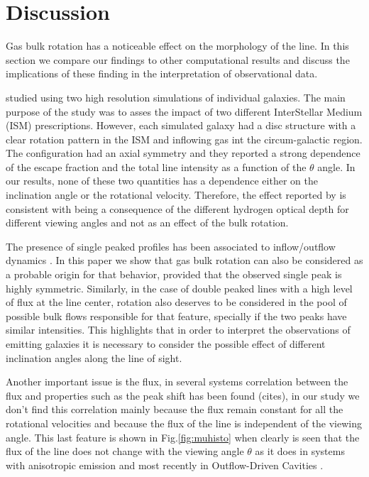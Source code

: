 \documentclass{emulateapj}
\newcommand{\ly}{{\ifmmode{{\rm Ly}\alpha~}\else{Ly$\alpha$~}\fi}}
\begin{document}
\section{Discussion}
\label{sec:discussion}

Gas bulk rotation has a noticeable effect on the morphology of the
 \ly line. In this section we compare our findings to other
 computational results and discuss the implications of these finding
 in the interpretation of observational data.


\cite{Verhamme12} studied \ly using two high resolution simulations
of individual galaxies. The main purpose of the study was to asses the
impact of two different InterStellar Medium (ISM) prescriptions. However, each simulated
galaxy had a disc structure with a clear rotation pattern in the ISM
and inflowing gas int the circum-galactic region. The configuration
had an axial symmetry and they reported a strong dependence of the
escape fraction and the total line intensity as a function of the
$\theta$ angle. In our results, none of these two quantities has a
dependence either on the inclination angle or the rotational
velocity. Therefore, the effect reported by \cite{Verhamme12} is
consistent with being a consequence of the different hydrogen optical
depth for different viewing angles and not as an effect of the bulk
rotation.  

The presence of single peaked profiles has been associated to
inflow/outflow dynamics \citep{Verhamme06,DijkstraKramer}. In this
paper we show that gas bulk rotation can also be considered as a
probable origin for that behavior, provided that the observed single peak is highly
symmetric. Similarly, in the case of double peaked lines with a high
level of flux at the line center, rotation also deserves to be considered in
the pool of possible bulk flows responsible for that feature,
specially if the two peaks have similar intensities. This highlights
that in order to interpret the observations of \ly emitting galaxies
it is necessary to consider the possible effect of different
inclination angles along the line of sight.

Another important issue is the \ly flux, in several systems correlation
between the \ly flux and properties such as the peak shift has been found
 (cites), in our study we don't find this correlation mainly because the flux remain 
 constant for all the rotational velocities and because the flux of the line
 is independent of the viewing angle. This last feature is shown in 
 Fig.\ref{fig:muhisto} when clearly is seen that the flux of the line
 does not change with the viewing angle $\theta$ as it does in systems with
 anisotropic \ly emission \citep{Zheng2013} and most recently in
  Outflow-Driven Cavities \citep{Behrens2014}. 
 
\end{document}
